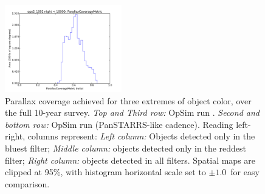\begin{figure}[ht]
\begin{center}
  \includegraphics[width=2.0in]{./figs/milkyway/MW_Astrom_paCovge_1092_10y_hst.pdf}
  \end{center}
  \caption{Parallax coverage achieved for three extremes of object color, over the full 10-year survey. {\it Top and Third row:} OpSim run . {\it Second and bottom row:} OpSim run  (PanSTARRS-like cadence). Reading left-right, columns represent: {\it Left column:} Objects detected only in the bluest filter; {\it Middle column:} objects detected only in the reddest filter; {\it Right column:} objects detected in all filters. Spatial maps are clipped at 95\%, with histogram horizontal scale set to $\pm 1.0$~for easy comparison.}
  \label{fig_astrom_ByFilter_PACoverage}
\end{figure}

